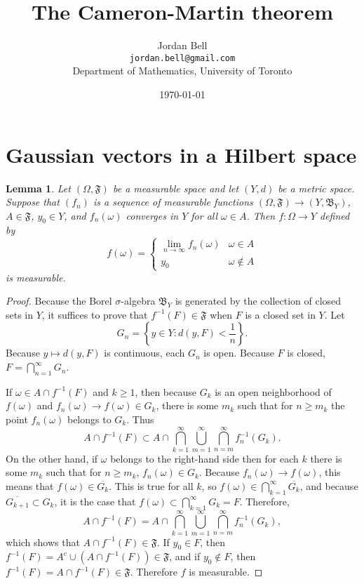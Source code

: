 \documentclass{article}
\newtheorem{lemma}[theorem]{Lemma}
\theoremstyle{definition}
\begin{document}
\title{The Cameron-Martin theorem}
\author{Jordan Bell\\ \texttt{jordan.bell@gmail.com}\\Department of Mathematics, University of Toronto}
\date{\today}

\maketitle

\section{Gaussian vectors in a Hilbert space}
\label{hilbert}
\begin{lemma}
Let $(\Omega,\mathfrak{F})$ be a measurable space and let $(Y,d)$ be a metric space. 
Suppose that $(f_n)$ is a sequence of measurable functions
$(\Omega,\mathfrak{F}) \to (Y,\mathfrak{B}_Y)$, 
$A \in \mathfrak{F}$, $y_0 \in Y$, and  
$f_n(\omega)$ converges in $Y$ for all $\omega \in A$. Then 
$f:\Omega \to Y$ defined by
\[
f(\omega) = \begin{cases}
\lim_{n \to \infty} f_n(\omega)&\omega \in A\\
y_0&\omega \not \in A
\end{cases}
\]
is measurable.
\label{pointwise}
\end{lemma}
\begin{proof}
Because the Borel $\sigma$-algebra $\mathfrak{B}_Y$ is generated by 
the collection of closed sets in $Y$, it suffices to prove that $f^{-1}(F) \in \mathfrak{F}$ when $F$ is a closed set
in $Y$. Let
\[
G_n = \left\{y \in Y: d(y,F)< \frac{1}{n} \right\}.
\]
Because $y \mapsto d(y,F)$ is continuous, each $G_n$ is open. Because $F$ is closed,
$F = \bigcap_{n=1}^\infty G_n$.


If $\omega \in A \cap f^{-1}(F)$ and $k \geq 1$,  then
because $G_k$ is an open neighborhood of $f(\omega)$ and $f_n(\omega) \to f(\omega) \in G_k$,
there is some $m_k$ such that for $n \geq m_k$ the point $f_n(\omega)$ belongs to $G_k$.
Thus 
\[
A \cap f^{-1}(F) \subset A \cap \bigcap_{k=1}^\infty \bigcup_{m=1}^\infty \bigcap_{n=m}^\infty f_n^{-1}(G_k).
\]
On the other hand, if $\omega$ belongs to the right-hand side then
for each $k$ there is some $m_k$ such that for $n \geq m_k$, $f_n(\omega) \in G_k$. Because
$f_n(\omega) \to f(\omega)$, this means that $f(\omega) \in \overline{G_k}$. 
This is true for all $k$, so $f(\omega) \in \bigcap_{k=1}^\infty \overline{G_k}$, and because 
$\overline{G_{k+1}} \subset G_k$, it is the case that
$f(\omega) \subset \bigcap_{k=1}^\infty G_k = F$. 
Therefore,
\[
A \cap f^{-1}(F) = A \cap \bigcap_{k=1}^\infty \bigcup_{m=1}^\infty \bigcap_{n=m}^\infty f_n^{-1}(G_k),
\]
which shows that $A \cap f^{-1}(F) \in \mathfrak{F}$. 
If $y_0 \in F$, then $f^{-1}(F) = A^c \cup  (A \cap f^{-1}(F)) \in \mathfrak{F}$, and if
$y_0 \not \in F$, then $f^{-1}(F) = A \cap f^{-1}(F) \in \mathfrak{F}$. Therefore $f$ is measurable.
\end{proof}
\end{document}
